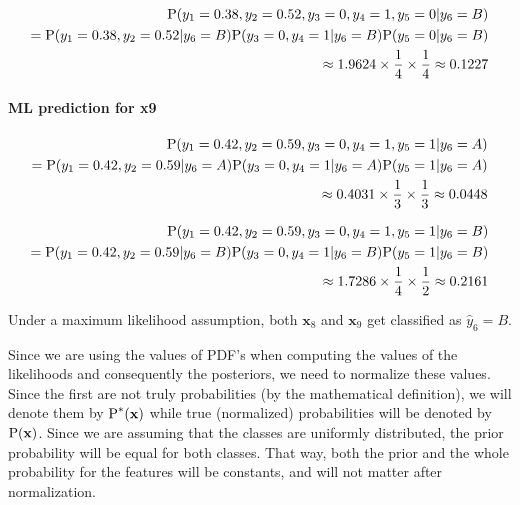 \documentclass[12pt]{article}
\begin{document}
\begin{enumerate}[leftmargin=\labelsep]
\begin{enumerate}
            \begin{equation}
            \begin{split}
                \textrm{P}(y_1 = 0.38, y_2 = 0.52, y_3 = 0, y_4 = 1, y_5 = 0|y_6 = B) \\
                = \textrm{P}(y_1 = 0.38, y_2 = 0.52|y_6 = B)\textrm{P}(y_3 = 0, y_4 = 1|y_6 = B)\textrm{P}(y_5 = 0|y_6 = B) \\
                \approx 1.9624 \times \frac{1}{4} \times \frac{1}{4} \approx 0.1227
            \end{split}
            \end{equation}

            \paragraph{ML prediction for x9}

            \begin{equation}
            \begin{split}
                \textrm{P}(y_1 = 0.42, y_2 = 0.59, y_3 = 0, y_4 = 1, y_5 = 1|y_6 = A) \\
                = \textrm{P}(y_1 = 0.42, y_2 = 0.59|y_6 = A)\textrm{P}(y_3 = 0, y_4 = 1|y_6 = A)\textrm{P}(y_5 = 1|y_6 = A) \\
                \approx 0.4031 \times \frac{1}{3} \times \frac{1}{3} \approx 0.0448
            \end{split}
            \end{equation}

            \begin{equation}
            \begin{split}
                \textrm{P}(y_1 = 0.42, y_2 = 0.59, y_3 = 0, y_4 = 1, y_5 = 1|y_6 = B) \\
                = \textrm{P}(y_1 = 0.42, y_2 = 0.59|y_6 = B)\textrm{P}(y_3 = 0, y_4 = 1|y_6 = B)\textrm{P}(y_5 = 1|y_6 = B) \\
                \approx 1.7286 \times \frac{1}{4} \times \frac{1}{2} \approx 0.2161
            \end{split}
            \end{equation}

            Under a maximum likelihood assumption, both $\mathbf{x}_8$ and $\mathbf{x}_9$ get classified as $\hat{y}_6 = B$.

            Since we are using the values of PDF's when computing the values of the likelihoods and consequently the posteriors, we need to normalize these values. Since the first are not truly probabilities (by the mathematical definition), we will denote them by $\textrm{P}^*(\mathbf{x})$ while true (normalized) probabilities will be denoted by $\textrm{P}(\mathbf{x})$.
            Since we are assuming that the classes are uniformly distributed, the prior probability will be equal for both classes. That way, both the prior and the whole probability for the features will be constants, and will not matter after normalization.
            

\end{enumerate}
\end{enumerate}
\end{document}
